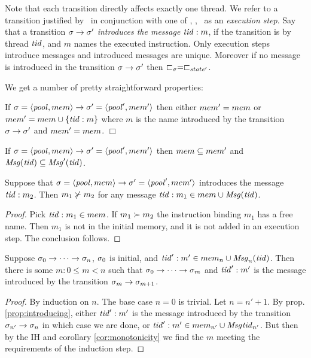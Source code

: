 Note that each transition directly affects exactly one thread.
We refer to a transition justified by \OpRule\ in conjunction with one of \expRule, \stoRule, \ldRule\ as an \emph{execution step}.
Say that a transition $\sigma\rightarrow\sigma'$ \emph{introduces the message} $\mathit{tid}: m$, if the transition is by thread $\mathit{tid}$, and $m$ names the executed instruction. Only execution steps introduce messages and introduced messages are unique. Moreover if no message is introduced in the transition $\sigma\rightarrow\sigma'$ then $\sqsubset_\sigma = \sqsubset_{state'}$.

We get a number of pretty straightforward properties:

\begin{proposition}
\label{prop:introducing}
If $\sigma=\langle\mathit{pool},mem\rangle\rightarrow\sigma'=\langle\mathit{pool}',mem'\rangle$ then either $mem'=mem$ or $mem'= mem\cup \{\mathit{tid}: m\}$ where
$m$ is the name introduced by the transition $\sigma\rightarrow\sigma'$ and $mem'=mem$. \hfill $\Box$
\end{proposition}

\begin{corollary}
\label{cor:monotonicity}
If $\sigma=\langle\mathit{pool},mem\rangle\rightarrow\sigma'=\langle\mathit{pool}',mem'\rangle$ then $mem\subseteq mem'$ and $\mathit{Msg}(\mathit{tid})\subseteq\mathit{Msg}'(\mathit{tid})$.
\end{corollary}

\begin{proposition}
\label{prop:depends}
Suppose that $\sigma=\langle\mathit{pool},mem\rangle\rightarrow\sigma'=\langle\mathit{pool}',mem'\rangle$ introduces the message $\mathit{tid}: m_2$. Then
$m_1\not\succ m_2$ for any message  $\mathit{tid}: m_1\in mem\cup\mathit{Msg}(\mathit{tid})$.
\end{proposition}
\begin{proof}
Pick $\mathit{tid}: m_1\in mem$. If $m_1\succ m_2$ the instruction
binding $m_1$ has a free name. Then $m_1$ is not in the initial memory, and it is not added in an execution step. The conclusion follows.
\end{proof}

\begin{proposition}
\label{prop:traceback}
Suppose $\sigma_0\rightarrow \cdots \rightarrow \sigma_n$,
$\sigma_0$ is initial, and $\mathit{tid}': m'\in mem_n\cup\mathit{Msg}_n(\mathit{tid})$. Then
there is some $m:0\leq m < n$ such that $\sigma_0\rightarrow\cdots \rightarrow \sigma_m$ and  $\mathit{tid}': m'$ is the message introduced by the
transition $\sigma_m\rightarrow\sigma_{m+1}$.
\end{proposition}
\begin{proof}
By induction on $n$. The base case $n=0$ is trivial. Let $n=n'+1$. By prop. \ref{prop:introducing}, either $\mathit{tid}': m'$ is the message introduced by the
transition $\sigma_{n'}\rightarrow \sigma_n$ in which case we are done,
or $\mathit{tid}': m'\in mem_{n'}\cup\mathit{Msg}{\mathit{tid}}_{n'}$. But then by the IH and
corollary \ref{cor:monotonicity} we find the $m$ meeting the requirements of the induction step.
\end{proof}

